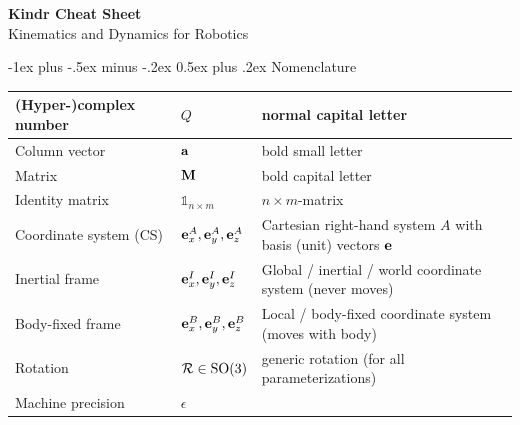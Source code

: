 \documentclass[10pt,landscape,a4paper]{article}
\makeatletter
\renewcommand{\section}{\@startsection{section}{1}{0mm}%
                                {-1ex plus -.5ex minus -.2ex}%
                                {0.5ex plus .2ex}%
                                {\normalfont\large\bfseries}}
\newcommand\identity{\mathds{1}}
\newcommand\linvel[2]{{}_#1\vv_{#2}}
\newcommand\rotvel[3]{{}_#1\vom_{#2\!#3}}
\makeatother
\begin{document}
\raggedright
\footnotesize
\begin{multicols}{2}


\setlength{\premulticols}{1pt}
\setlength{\postmulticols}{1pt}
\setlength{\multicolsep}{1pt}
\setlength{\columnsep}{2pt}

\begin{center}
     \Large{\textbf{Kindr Cheat Sheet}} \\
      \small{Kinematics and Dynamics for Robotics}
\end{center}
\section{Nomenclature }
\begin{tabular}{|l|l@{}|l|}
\hline
(Hyper-)complex number & $Q$ & normal capital letter  \\ \hline
Column vector & $\mathbf a$ & bold small letter  \\ \hline
Matrix & $\mathbf M$ & bold capital letter  \\ \hline
Identity matrix & $\identity_{n\times m}$ & ${n \times m}$-matrix  \\  \hline
Coordinate system (CS) & ${\mathbf e_x^A,\mathbf e_y^A,\mathbf e_z^A}$ & Cartesian right-hand system $A$ with basis (unit) vectors $\mathbf e$  \\ \hline
Inertial frame & ${\mathbf e_x^I,\mathbf e_y^I,\mathbf e_z^I}$ & Global / inertial / world coordinate system (never moves) \\ \hline
Body-fixed frame & ${\mathbf e_x^B,\mathbf e_y^B,\mathbf e_z^B}$ & Local / body-fixed coordinate system (moves with body) \\ \hline
Rotation & $\mathcal{R} \in \mathrm{SO}(3)$ & generic rotation (for all parameterizations) \\ \hline
Machine precision & $\epsilon$ & \\ \hline


\end{tabular}
\end{multicols}
\end{document}
